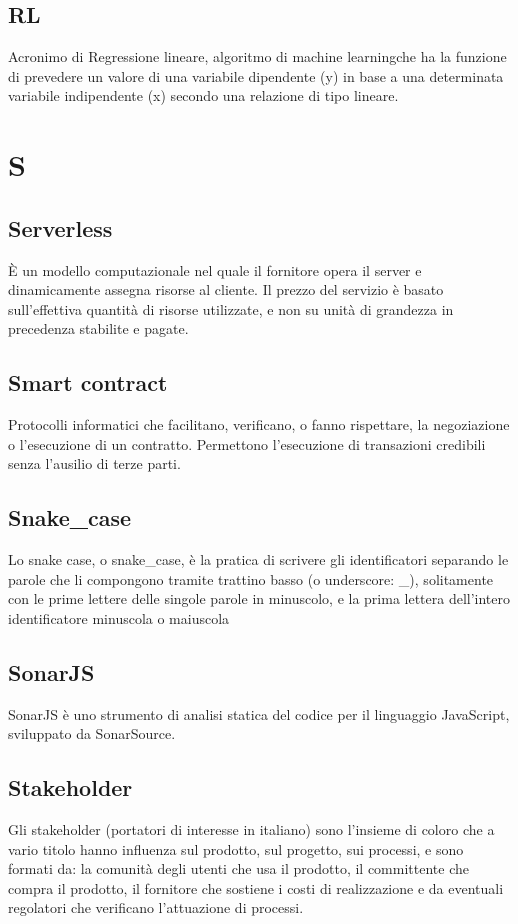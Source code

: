 \subsection*{RL}
Acronimo di Regressione lineare, algoritmo di machine learning\glosp che ha la funzione di prevedere un valore di una variabile dipendente (y) in base a una determinata variabile indipendente (x) secondo una relazione di tipo lineare.

\clearpage
\section*{S}

\subsection*{Serverless}
È un modello computazionale nel quale il fornitore opera il server e dinamicamente assegna risorse al cliente. Il prezzo del servizio è basato sull'effettiva quantità di risorse utilizzate, e non su unità di grandezza in precedenza stabilite e pagate.

\subsection*{Smart contract}
Protocolli informatici che facilitano, verificano, o fanno rispettare, la negoziazione o l'esecuzione di un contratto. Permettono l'esecuzione di transazioni credibili senza l'ausilio di terze parti.

\subsection*{Snake\_case}
Lo snake case, o snake\_case, è la pratica di scrivere gli identificatori separando le parole che li compongono tramite trattino basso (o underscore: \_), solitamente con le prime lettere delle singole parole in minuscolo, e la prima lettera dell'intero identificatore minuscola o maiuscola

\subsection*{SonarJS}
SonarJS è uno strumento di analisi statica del codice per il linguaggio JavaScript, sviluppato da SonarSource.

\subsection*{Stakeholder}
Gli stakeholder (portatori di interesse in italiano) sono l’insieme di coloro che a vario titolo hanno influenza sul prodotto, sul progetto, sui processi, e sono formati da: la comunità degli utenti che usa il prodotto, il committente che compra il prodotto, il fornitore che sostiene i costi di realizzazione e da eventuali regolatori che verificano l’attuazione di processi.

